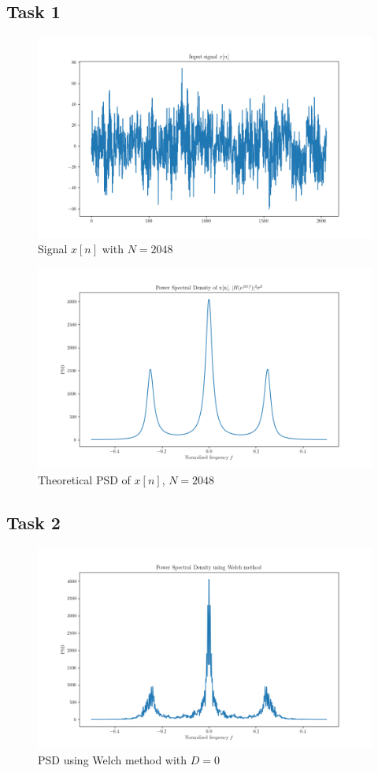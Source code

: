 \documentclass{article}
\begin{document}
\subsection{Task 1}
\begin{figure}[!ht]
\includegraphics[width=\textwidth]{x_n.png}
\caption{Signal $x[n]$ with $N=2048$}
\label{fig:x_n}
\end{figure}
\begin{figure}[!ht]
\includegraphics[width=\textwidth]{PSD_t.png}
\caption{Theoretical PSD of $x[n]$, $N=2048$}
\label{fig:psdt}
\end{figure}
\clearpage
\subsection{Task 2}
\begin{figure}[!ht]
\includegraphics[width=\textwidth]{PSD_Welch_0.png}
\caption{PSD using Welch method with $D=0$}
\label{fig:psdw0}
\end{figure}
\end{document}
